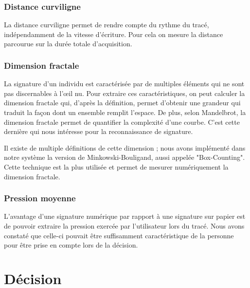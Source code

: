 \documentclass[fontsize=10pt, twoside=no]{scrartcl} %
\begin{document}
\section{Distance curviligne}

La distance curviligne permet de rendre compte du \og rythme \fg du tracé, indépendamment de la vitesse d'écriture. Pour cela on mesure la distance parcourue sur la durée totale d'acquisition.

\section{Dimension fractale}

La signature d'un individu est caractérisée par de multiples éléments qui ne sont pas discernables à l'œil nu. Pour extraire ces caractéristiques, on peut calculer la dimension fractale qui, d'après la définition, permet d'obtenir une grandeur qui traduit la façon dont un ensemble remplit l'espace. De plus, selon Mandelbrot, la dimension fractale permet de quantifier la complexité d'une courbe. C'est cette dernière qui nous intéresse pour la reconnaissance de signature.

Il existe de multiple définitions de cette dimension ; nous avons implémenté dans notre système la version de Minkowski-Bouligand, aussi appelée "Box-Counting". Cette technique est la plus utilisée et permet de mesurer numériquement la dimension fractale.


\section{Pression moyenne}

L'avantage d'une signature numérique par rapport à une signature sur papier est de pouvoir extraire la pression exercée par l'utilisateur lors du tracé. Nous avons constaté que celle-ci pouvait être suffisamment caractéristique de la personne pour être prise en compte lors de la décision.

\part{Décision}
\end{document}
